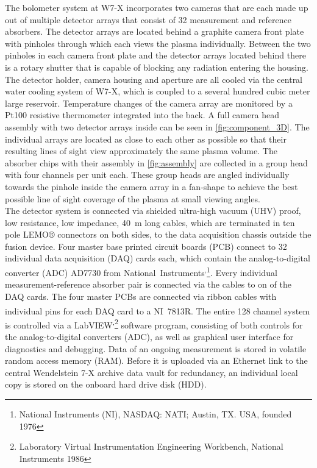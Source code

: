             The bolometer system at W7-X incorporates two cameras that are each made up out of multiple detector arrays that consist of 32 measurement and reference absorbers. The detector arrays are located behind a graphite camera front plate with pinholes through which each views the plasma individually. Between the two pinholes in each camera front plate and the detector arrays located behind there is a rotary shutter that is capable of blocking any radiation entering the housing. The detector holder, camera housing and aperture are all cooled via the central water cooling system of W7-X, which is coupled to a several hundred cubic meter large reservoir. Temperature changes of the camera array are monitored by a Pt100 resistive thermometer integrated into the back. A full camera head assembly with two detector arrays inside can be seen in \cref{fig:component_3D}. The individual arrays are located as close to each other as possible so that their resulting lines of sight view approximately the same plasma volume. The absorber chips with their assembly in \cref{fig:assembly} are collected in a group head with four channels per unit each. These group heads are angled individually towards the pinhole inside the camera array in a fan-shape to achieve the best possible line of sight coverage of the plasma at small viewing angles.\\%
            The detector system is connected via shielded ultra-high vacuum (UHV) proof, low resistance, low impedance, \mbox{\SI{40}{\meter}} long cables, which are terminated in ten pole LEMO® connectors on both sides, to the data acquisition chassis outside the fusion device. Four master base printed circuit boards (PCB) connect to 32 individual data acquisition (DAQ) cards each, which contain the analog-to-digital converter (ADC) AD7730 from \mbox{National Instruments\textsuperscript{\textregistered,}}\footnote[1]{National Instruments (NI), NASDAQ: NATI; Austin, TX. USA, founded 1976}. Every individual measurement-reference absorber pair is connected via the cables to on of the DAQ cards. The four master PCBs are connected via ribbon cables with individual pins for each DAQ card to a \mbox{NI\textsuperscript{\textregistered} 7813R}. The entire 128 channel system is controlled via a \mbox{LabVIEW\textsuperscript{\textregistered,}}\footnote[2]{Laboratory Virtual Instrumentation Engineering Workbench, National Instruments 1986} software program, consisting of both controls for the analog-to-digital converters (ADC), as well as graphical user interface for diagnostics and debugging. Data of an ongoing measurement is stored in volatile random access memory (RAM). Before it is uploaded via an Ethernet link to the central Wendelstein 7-X archive data vault for redundancy, an individual local copy is stored on the onboard hard drive disk (HDD).%
%
